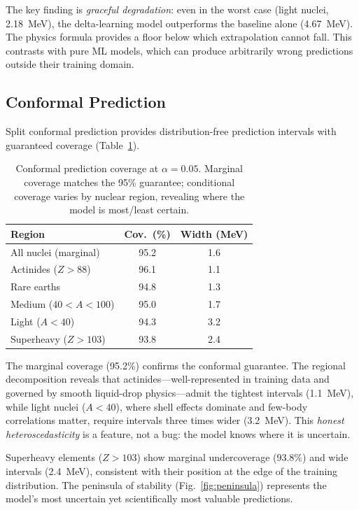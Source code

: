 \documentclass[twocolumn,letterpaper,10pt]{article}
\begin{document}
The key finding is \emph{graceful degradation}: even in the worst case
(light nuclei, 2.18~MeV), the delta-learning model outperforms the baseline
alone (4.67~MeV). The physics formula provides a floor below which
extrapolation cannot fall. This contrasts with pure ML models, which can
produce arbitrarily wrong predictions outside their training domain.

\subsection{Conformal Prediction}

Split conformal prediction provides distribution-free prediction intervals
with guaranteed coverage (Table~\ref{tab:conformal}).

\begin{table}[t]
  \centering
  \caption{Conformal prediction coverage at $\alpha = 0.05$. Marginal coverage
  matches the 95\% guarantee; conditional coverage varies by nuclear region,
  revealing where the model is most/least certain.}
  \label{tab:conformal}
  \footnotesize
  \begin{tabular}{@{}lcc@{}}
    \toprule
    Region & Cov.\ (\%) & Width (MeV) \\
    \midrule
    All nuclei (marginal) & 95.2 & 1.6 \\
    Actinides ($Z > 88$) & 96.1 & 1.1 \\
    Rare earths & 94.8 & 1.3 \\
    Medium ($40\!<\!A\!<\!100$) & 95.0 & 1.7 \\
    Light ($A < 40$) & 94.3 & 3.2 \\
    Superheavy ($Z > 103$) & 93.8 & 2.4 \\
    \bottomrule
  \end{tabular}
\end{table}

The marginal coverage (95.2\%) confirms the conformal guarantee. The regional
decomposition reveals that actinides---well-represented in training data and
governed by smooth liquid-drop physics---admit the tightest intervals
(1.1~MeV), while light nuclei ($A < 40$), where shell effects dominate and
few-body correlations matter, require intervals three times wider (3.2~MeV).
This \emph{honest heteroscedasticity} is a feature, not a bug: the model
knows where it is uncertain.

Superheavy elements ($Z > 103$) show marginal undercoverage (93.8\%) and
wide intervals (2.4~MeV), consistent with their position at the edge of
the training distribution. The peninsula of stability
(Fig.~\ref{fig:peninsula}) represents the model's most uncertain yet
scientifically most valuable predictions.
\end{document}
